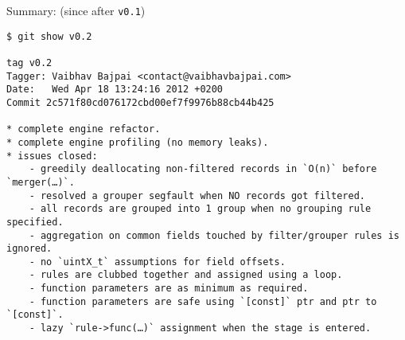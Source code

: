 Summary: (since after \lstinline!v0.1!)

\begin{lstlisting}
$ git show v0.2

tag v0.2
Tagger: Vaibhav Bajpai <contact@vaibhavbajpai.com>
Date:   Wed Apr 18 13:24:16 2012 +0200    
Commit 2c571f80cd076172cbd00ef7f9976b88cb44b425

* complete engine refactor.
* complete engine profiling (no memory leaks).
* issues closed:
    - greedily deallocating non-filtered records in `O(n)` before `merger(…)`.
    - resolved a grouper segfault when NO records got filtered.
    - all records are grouped into 1 group when no grouping rule specified.
    - aggregation on common fields touched by filter/grouper rules is ignored.
    - no `uintX_t` assumptions for field offsets.
    - rules are clubbed together and assigned using a loop.
    - function parameters are as minimum as required.
    - function parameters are safe using `[const]` ptr and ptr to `[const]`.
    - lazy `rule->func(…)` assignment when the stage is entered.    
\end{lstlisting}

